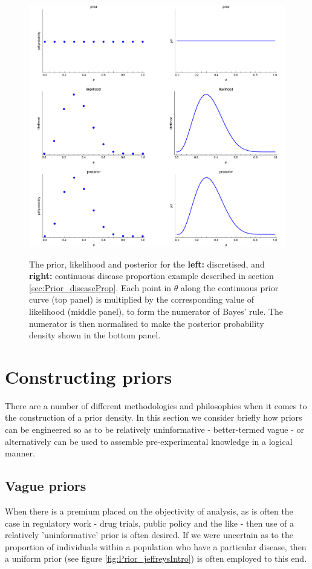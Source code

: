 \documentclass[11pt,fullpage]{book}
\begin{document}
\begin{figure}
\centering
\scalebox{0.5} 
{\includegraphics{Prior_diseaseDiscretised.pdf}}
\caption{The prior, likelihood and posterior for the \textbf{left:} discretised, and \textbf{right:} continuous disease proportion example described in section \ref{sec:Prior_diseaseProp}. Each point in $\theta$ along the continuous prior curve (top panel) is multiplied by the corresponding value of likelihood (middle panel), to form the numerator of Bayes' rule. The numerator is then normalised to make the posterior probability density shown in the bottom panel.}\label{fig:Prior_diseaseDiscretised}
\end{figure}

\section{Constructing priors}
There are a number of different methodologies and philosophies when it comes to the construction of a prior density. In this section we consider briefly how priors can be engineered so as to be relatively uninformative - better-termed vague - or alternatively can be used to assemble pre-experimental knowledge in a logical manner.

\subsection{Vague priors}\label{sec:Prior_vague}
When there is a premium placed on the objectivity of analysis, as is often the case in regulatory work - drug trials, public policy and the like - then use of a relatively 'uninformative' prior is often desired. If we were uncertain as to the proportion of individuals within a population who have a particular disease, then a uniform prior (see figure \ref{fig:Prior_jeffreysIntro}) is often employed to this end. 
\end{document}
